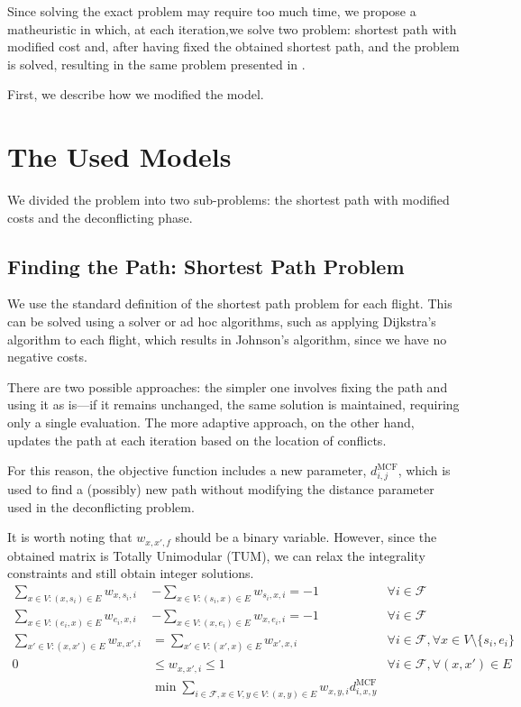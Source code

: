\documentclass[../thesis.tex]{subfiles}
\begin{document}
Since solving the exact problem may require too much time, we propose a matheuristic in which, at each iteration,we solve two problem: shortest path with modified cost and, after having fixed the obtained shortest path, and the problem is solved, resulting in the same problem presented in \cite{pelegrin-2023}.  

First, we describe how we modified the model.

\section{The Used Models}
We divided the problem into two sub-problems: the shortest path with modified costs and the deconflicting phase.

\subsection{Finding the Path: Shortest Path Problem}\label{sssec:spp}
We use the standard definition of the shortest path problem for each flight.  
This can be solved using a solver or ad hoc algorithms, such as applying Dijkstra's algorithm to each flight, which results in Johnson's algorithm, since we have no negative costs.  

There are two possible approaches: the simpler one involves fixing the path and using it as is—if it remains unchanged, the same solution is maintained, requiring only a single evaluation. The more adaptive approach, on the other hand, updates the path at each iteration based on the location of conflicts.

For this reason, the objective function includes a new parameter, $d^\text{MCF}_{i,j}$, which is used to find a (possibly) new path without modifying the distance parameter used in the deconflicting problem.  

It is worth noting that $w_{x,x',f}$ should be a binary variable. However, since the obtained matrix is Totally Unimodular (TUM), we can relax the integrality constraints and still obtain integer solutions.
\begin{align}
    \sum_{x\in V:(x,s_i)\in E} w_{x,s_{i},i} &- \sum_{x\in V:(s_i,x)\in E} w_{s_{i},x,i} = -1 & \forall i \in \mathcal{F}\label{eq:spp:source} \\
    \sum_{x\in V:(e_i,x)\in E} w_{e_{i},x,i} &- \sum_{x\in V:(x,e_i)\in E} w_{x,e_{i},i} = -1 & \forall i \in \mathcal{F}\label{eq:spp:sink} \\
    \sum_{x'\in V:(x,x')\in E} w_{x,x',i} &= \sum_{x'\in V:(x',x)\in E} w_{x',x,i} & \forall i \in \mathcal{F}, \forall x \in V\setminus\{s_{i}, e_{i}\}\label{eq:spp:nodes}\\
    0 &\leq w_{x,x',i} \leq 1 & \forall i \in \mathcal{F}, \forall (x,x') \in E \nonumber \\
    &\min \sum_{i \in \mathcal{F}, x \in V, y \in V:(x,y)\in E} w_{x,y,i} d^\text{MCF}_{i,x,y}\label{eq:spp:obj}
\end{align}
\end{document}
